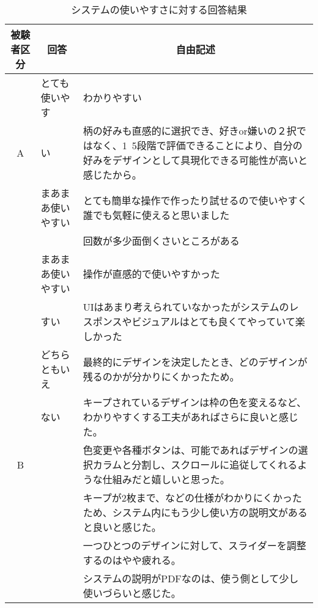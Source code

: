\begin{table}[htbp]
    \centering
    \caption{システムの使いやすさに対する回答結果}
    \begin{tabular}{|c|p{7em}|p{26em}|} \hline
        被験者区分 & \multicolumn{1}{|c|}{回答} & \multicolumn{1}{|c|}{自由記述} \\ \hline
         & とても使いやす&わかりやすい \\\cline{3-3}
        A&い &柄の好みも直感的に選択でき、好きor嫌いの２択ではなく、1~5段階で評価できることにより、自分の好みをデザインとして具現化できる可能性が高いと感じたから。\\ \cline{2-3}
        & まあまあ使いやすい & とても簡単な操作で作ったり試せるので使いやすく誰でも気軽に使えると思いました\\\cline{3-3}
         & & 回数が多少面倒くさいところがある\\ \hline
         & まあまあ使いやすい&操作が直感的で使いやすかった\\\cline{3-3}
         &すい &UIはあまり考えられていなかったがシステムのレスポンスやビジュアルはとても良くてやっていて楽しかった\\ \cline{2-3} 
         & どちらともいえ&最終的にデザインを決定したとき、どのデザインが残るのかが分かりにくかったため。\\\cline{3-3}
         &ない &キープされているデザインは枠の色を変えるなど、わかりやすくする工夫があればさらに良いと感じた。\\\cline{3-3}
         B& & 色変更や各種ボタンは、可能であればデザインの選択カラムと分割し、スクロールに追従してくれるような仕組みだと嬉しいと思った。\\\cline{3-3}
         & & キープが2枚まで、などの仕様がわかりにくかったため、システム内にもう少し使い方の説明文があると良いと感じた。\\\cline{3-3}
         & & 一つひとつのデザインに対して、スライダーを調整するのはやや疲れる。\\\cline{3-3}
         &　&システムの説明がPDFなのは、使う側として少し使いづらいと感じた。\\ \hline
        
        
        

    \end{tabular}
    \label{free4}
\end{table}

